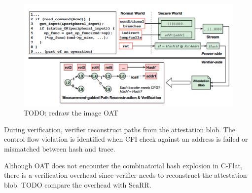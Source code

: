\begin{figure}[htbp]
\centerline{\includegraphics[scale=.5]{Figures/01/oat.png}}
\caption{TODO: redraw the image OAT}
\label{fig:oat}
\end{figure}

During verification, verifier reconstruct paths from the attestation blob. The control flow violation is identified when CFI check against an address is failed or mismatched between hash and trace.

Although OAT does not encounter the combinatorial hash explosion in C-Flat, there is a verification overhead since verifier needs to reconstruct the attestation blob. TODO compare the overhead with ScaRR.
